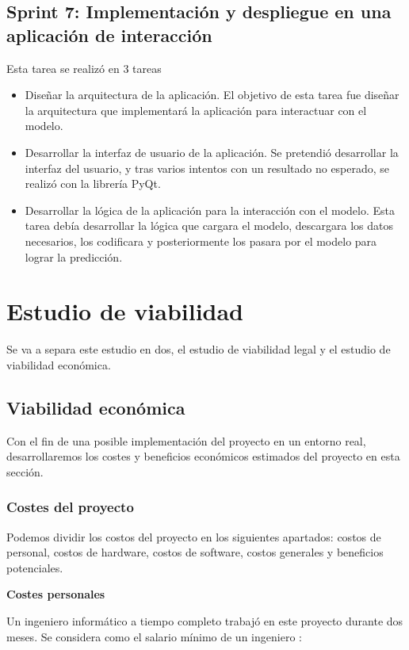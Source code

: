 \subsection{Sprint 7: Implementación y despliegue en una aplicación de interacción}
Esta tarea se realizó en 3 tareas
\begin{itemize}
    \item Diseñar la arquitectura de la aplicación.
    El objetivo de esta tarea fue diseñar la arquitectura que implementará la aplicación para interactuar con el modelo.
    \item Desarrollar la interfaz de usuario de la aplicación.
    Se pretendió desarrollar la interfaz del usuario, y tras varios intentos con un resultado no esperado, se realizó con la librería PyQt.
    \item Desarrollar la lógica de la aplicación para la interacción con el modelo.
    Esta tarea debía desarrollar la lógica que cargara el modelo, descargara los datos necesarios, los codificara y posteriormente los pasara por el modelo para lograr la predicción.
\end{itemize}

\section{Estudio de viabilidad}

Se va a separa este estudio en dos, el estudio de viabilidad legal y el estudio de viabilidad económica.

\subsection{Viabilidad económica}

Con el fin de una posible implementación del proyecto en un entorno real, desarrollaremos los costes y beneficios económicos estimados del proyecto en esta sección.

\subsubsection{Costes del proyecto}

Podemos dividir los costos del proyecto en los siguientes apartados: costos de personal, costos de hardware, costos de software, costos generales y beneficios potenciales.

\textbf{Costes personales}

Un ingeniero informático a tiempo completo trabajó en este proyecto durante dos meses. Se considera como el salario mínimo de un ingeniero \cite{salariogob}:

